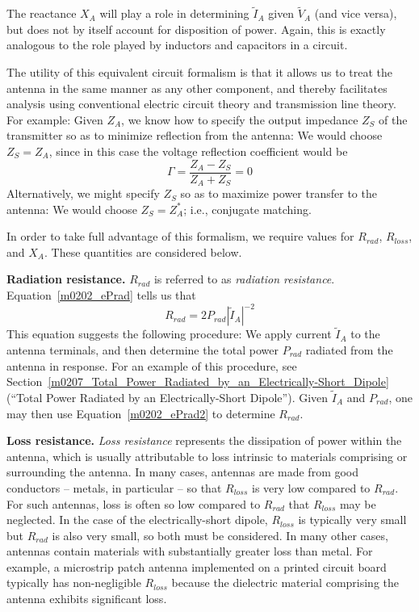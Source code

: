 The reactance $X_A$ will play a role in determining $\widetilde{I}_A$ given $\widetilde{V}_A$ (and vice versa), but does not by itself account for disposition of power.  Again, this is exactly analogous to the role played by inductors and capacitors in a circuit.

The utility of this equivalent circuit formalism is that it allows us to treat the antenna in the same manner as any other component, and thereby facilitates analysis using conventional electric circuit theory and transmission line theory.  
For example: 
Given $Z_A$, 
we know how to specify the output impedance $Z_S$ of the transmitter so as to minimize reflection from the antenna:  We would choose $Z_S=Z_A$, since in this case the voltage reflection coefficient would be
%
\begin{equation}
\Gamma = \frac{Z_A-Z_S}{Z_A+Z_S} = 0
\end{equation}
% 
Alternatively, we might specify $Z_S$ so as to maximize power transfer to the antenna:  We would choose $Z_S=Z_A^*$; i.e., conjugate matching.

In order to take full advantage of this formalism, we require values for $R_{rad}$, $R_{loss}$, and $X_A$.  
These quantities are considered below.

{\bf Radiation resistance.}
$R_{rad}$ is referred to as \emph{radiation resistance}.
Equation~\ref{m0202_ePrad} tells us that
%
\begin{equation}
R_{rad} = 2P_{rad}\left|\widetilde{I}_A\right|^{-2}
\label{m0202_ePrad2}
\end{equation}
%
This equation suggests the following procedure:  We apply current $\widetilde{I}_A$ to the antenna terminals, and then determine the total power $P_{rad}$ radiated from the antenna in response.
For an example of this procedure, see Section~\ref{m0207_Total_Power_Radiated_by_an_Electrically-Short_Dipole} (``Total Power Radiated by an Electrically-Short Dipole'').
Given $\widetilde{I}_A$ and $P_{rad}$, one may then use Equation~\ref{m0202_ePrad2} to determine $R_{rad}$.  

{\bf Loss resistance.}
\emph{Loss resistance} represents the dissipation of power within the antenna, which is usually attributable to loss intrinsic to materials comprising or surrounding the antenna.  
In many cases, antennas are made from good conductors -- metals, in particular -- so that $R_{loss}$ is very low compared to $R_{rad}$.
For such antennas, loss is often so low compared to $R_{rad}$ that $R_{loss}$ may be neglected.
In the case of the electrically-short dipole, $R_{loss}$ is typically very small but $R_{rad}$ is also very small, so both must be considered.
In many other cases, antennas contain materials with substantially greater loss than metal.
For example, a microstrip patch antenna 
implemented on a printed circuit board
typically has non-negligible $R_{loss}$ because the dielectric material comprising the antenna exhibits significant loss.

